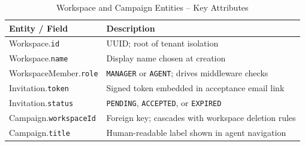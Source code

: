 \documentclass[12pt,a4paper]{report}
\newcommand{\reporttablesetup}{%
  \small%
  \setlength{\tabcolsep}{5pt}%
  \renewcommand{\arraystretch}{1.22}%
  \arrayrulecolor{framegray}%
}
\begin{document}
\begin{table}[!htbp]
  \centering
  \reporttablesetup
  \footnotesize
  \begin{tabularx}{\textwidth}{|p{5.5cm}|Y|}
    \hline
    \textbf{Entity / Field} & \textbf{Description} \\
    \hline
    Workspace.\allowbreak\texttt{id}   & UUID; root of tenant isolation \\
    \hline
    Workspace.\allowbreak\texttt{name} & Display name chosen at creation \\
    \hline
    WorkspaceMember.\allowbreak\texttt{role} & \texttt{MANAGER} or \texttt{AGENT};
      drives middleware checks \\
    \hline
    Invitation.\allowbreak\texttt{token} & Signed token embedded in acceptance email
      link \\
    \hline
    Invitation.\allowbreak\texttt{status} & \texttt{PENDING}, \texttt{ACCEPTED}, or
      \texttt{EXPIRED} \\
    \hline
    Campaign.\allowbreak\texttt{workspaceId} & Foreign key; cascades with workspace
      deletion rules \\
    \hline
    Campaign.\allowbreak\texttt{title} & Human-readable label shown in agent
      navigation \\
    \hline
  \end{tabularx}
  \caption{Workspace and Campaign Entities -- Key Attributes}
  \label{tab:entity-workspace}
\end{table}
\end{document}
